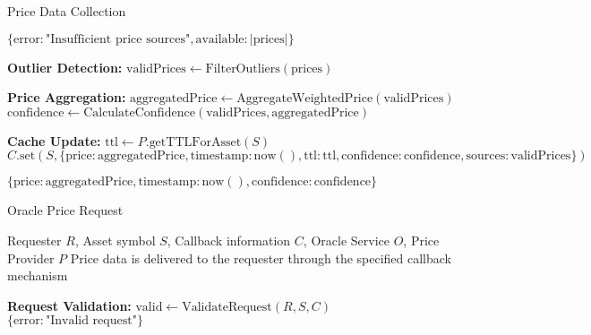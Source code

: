 \begin{tcolorbox}
\begin{tcolorbox}
\begin{protocol}{Price Data Collection}
\begin{algorithmic}[1]
    \State \Return $\{\text{error}: \text{"Insufficient price sources"}, \text{available}: |\text{prices}|\}$
\EndIf

\State \textbf{Outlier Detection:}
\State $\text{validPrices} \gets \text{FilterOutliers}(\text{prices})$

\State \textbf{Price Aggregation:}
\State $\text{aggregatedPrice} \gets \text{AggregateWeightedPrice}(\text{validPrices})$
\State $\text{confidence} \gets \text{CalculateConfidence}(\text{validPrices}, \text{aggregatedPrice})$

\State \textbf{Cache Update:}
\State $\text{ttl} \gets P.\text{getTTLForAsset}(S)$
\State $C.\text{set}(S, \{\text{price}: \text{aggregatedPrice}, \text{timestamp}: \text{now}(), \text{ttl}: \text{ttl}, \text{confidence}: \text{confidence}, \text{sources}: \text{validPrices}\})$

\State \Return $\{\text{price}: \text{aggregatedPrice}, \text{timestamp}: \text{now}(), \text{confidence}: \text{confidence}\}$
\end{algorithmic}
\end{protocol}
\end{tcolorbox}


\begin{tcolorbox}[
    enhanced,
    colback=blue!5!white,
    colframe=blue!75!black,
    arc=5mm,
    boxrule=1.5pt,
    title=Price Feed Protocol,
    fonttitle=\bfseries,
    coltitle=white,
    attach boxed title to top left={yshift=-2mm, xshift=5mm},
    boxed title style={colback=blue!75!black, rounded corners},
    shadow={2mm}{-2mm}{0mm}{black!50},
    drop fuzzy shadow
]
\begin{tcolorbox}[
    enhanced,
    colback=blue!5!white,
    colframe=blue!75!black,
    arc=5mm,
    boxrule=1.5pt,
    title=Protocol,
    fonttitle=\bfseries,
    coltitle=white,
    attach boxed title to top left={yshift=-2mm, xshift=5mm},
    boxed title style={colback=blue!75!black, rounded corners},
    shadow={2mm}{-2mm}{0mm}{black!50},
    drop fuzzy shadow
]
\begin{protocol}{Oracle Price Request}
\label{prot:oracle-price-request}
\begin{algorithmic}[1]
\Require Requester $R$, Asset symbol $S$, Callback information $C$, Oracle Service $O$, Price Provider $P$
\Ensure Price data is delivered to the requester through the specified callback mechanism

\State \textbf{Request Validation:}
\State $\text{valid} \gets \text{ValidateRequest}(R, S, C)$
    \State \Return $\{\text{error}: \text{"Invalid request"}\}$
\EndIf


\end{algorithmic}
\end{protocol}
\end{tcolorbox}
\end{tcolorbox}
\end{tcolorbox}
